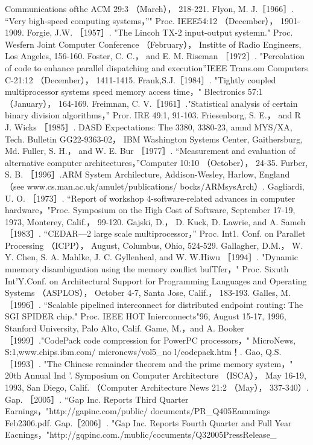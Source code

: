 Communications ofthe ACM 29:3 （March）， 218-221.
Flyon, M. J.［1966］. “Very bigh-speed computing systems，”" Proc. IEEE54:12 （December）， 1901-1909.
Forgie, J.W. ［1957］. "The Lincoh TX-2 input-output systemn." Proc. Wesfern Joint Computer Conference （February）， Institte of
Radio Engineers, Los Angeles, 156-160.
Foster, C. C.， and E. M. Riseman ［1972］. "Percolation of code to enhance parallel dispatching and execution”IEEE Trans.om
Computers C-21:12 （December）， 1411-1415.
Frank,S.J.［1984］. "Tightly coupled multiprocessor systems speed memory access time，" Blectronics 57:1 （January）， 164-169.
Freimnan, C. V.［1961］."Statistical analysis of certain binary division algorithms，” Pror. IRE 49:1, 91-103.
Friesenborg, S. E.， and R J. Wicks ［1985］. DASD Expectations: The 3380, 3380-23, amnd MYS/XA, Tech. Bulletin GG22-9363-02，
IBM Washington Systems Center, Gaithersburg, Md.
Fuller, S. H.， and W. E. Bur ［1977］. “Measurement and evaluation of alternative computer architectures，”Computer 10:10
（October）， 24-35.
Furber, S. B. ［1996］.ARM System Archilecture, Addison-Wesley, Harlow, England （see www.cs.man.ac.uk/amulet/publications/
bocks/ARMsysArch）.
Gagliardi, U. O. ［1973］. “Report of workshop 4-software-related advances in computer hardware，"Proc. Symposium on the
High Cost of Software, September 17-19, 1973, Monterey, Calif.， 99-120.
Gajski, D.， D. Kuck, D. Lawrie, and A. Sameh ［1983］. “CEDAR—2 large scale multiprocessor，” Proc. Int1. Conf. on Parallet
Processing （ICPP）， August, Columbus, Ohio, 524-529.
Gallagher, D.M.， W. Y. Chen, S. A. Mahlke, J. C. Gyllenheal, and W. W.Hiwu ［1994］. "Dynamic mnemory disambiguation using
the memory conflict bufTfer，" Proc. Sixuth Int'Y.Conf. on Architectural Support for Programming Languages and Operating
Systems （ASPLOS）， October 4-7, Santa Jose, Calif.， 183-193.
Galles, M. ［1996］. “Scalable pipelined interconnect for distributed endpoint routing: The SGI SPIDER chip." Proc. IEEE HOT
Inierconnects"96, August 15-17, 1996, Stanford University, Palo Alto, Calif.
Game, M.，and A. Booker ［1999］."CodePack code compression for PowerPC processors，" MicroNews, S:1,www.chips.ibm.com/
micronews/vol5_no l/codepack.htm！.
Gao, Q.S. ［1993］. "The Chinese remainder theorem and the prime memory system，" 20th Annual Ind '. Symposium on Computer
Architecture （ISCA）， May 16-19, 1993, San Diego, Calif. （Computer Architecture News 21:2 （May）， 337-340）.
Gap. ［2005］. “Gap Inc. Reports Third Quarter Earnings，"http://gapinc.com/public/ documents/PR_Q405Eammings Feb2306.pdf.
Gap.［2006］. "Gap Inc. Reports Fourth Quarter and Full Year Eacnings，"http://gqpinc.com./mublic/cocuments/Q32005PressRelease_
